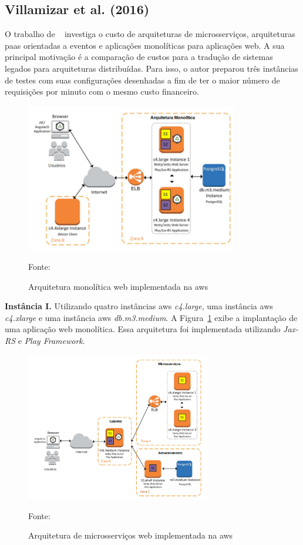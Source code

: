 \subsection{Villamizar et al. (2016)}



O trabalho de ~\cite{7515686} investiga o custo de arquiteturas de microsserviços, arquiteturas \ac{paas} orientadas a eventos e aplicações monolíticas para aplicações web.
%
A sua principal motivação é a comparação de custos para a tradução de sistemas legados para arquiteturas distribuídas.
%
Para isso, o autor preparou três instâncias de testes com suas configurações desenhadas a fim de ter o maior número de requisições por minuto com o mesmo custo financeiro.



\begin{figure}[htb!]
\caption{Arquitetura monolítica web implementada na \ac{aws}}
\label{fig:aws_monolitico}
\includegraphics[height=6.5cm]{img/cap2/aws_monolitico.png}
\centering

Fonte:~\cite{7515686}
\end{figure}


\textbf{Instância I.} Utilizando quatro instâncias \ac{aws} \textit{c4.large}, uma instância \ac{aws} \textit{c4.xlarge} e uma instância \ac{aws} \textit{db.m3.medium}.
%
A Figura~\ref{fig:aws_monolitico} exibe a implantação de uma aplicação web monolítica.
%
Essa arquitetura foi implementada utilizando \textit{Jax-RS} e \textit{Play Framework}.




\begin{figure}[htb!]
\caption{Arquitetura de microsserviços web implementada na \ac{aws}}
\label{fig:aws_microsservicos}
\includegraphics[height=6.5cm]{img/cap2/aws_microsservicos.png}
\centering

Fonte:~\cite{7515686}
\end{figure}

